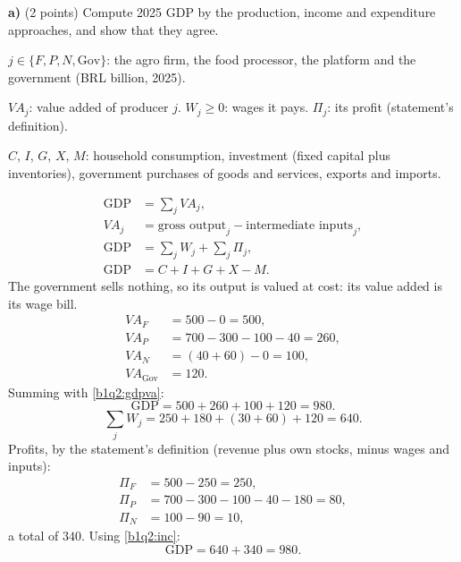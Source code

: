 \textbf{a)} (2 points) Compute 2025 GDP by the production, income and expenditure approaches, and show that they agree.
\resolespaco
\begin{sol}
\begin{notacao}
\item $j\in\{F,P,N,\text{Gov}\}$: the agro firm, the food processor, the platform and the government (BRL billion, 2025).
\item $VA_j$: value added of producer $j$. $W_j\ge0$: wages it pays. $\Pi_j$: its profit (statement's definition).
\item $C$, $I$, $G$, $X$, $M$: household consumption, investment (fixed capital plus inventories), government purchases
of goods and services, exports and imports.
\end{notacao}
\begin{align}
\text{GDP}&=\textstyle\sum_j VA_j, \label{b1q2:gdpva}\\
VA_j&=\text{gross output}_j-\text{intermediate inputs}_j, \label{b1q2:va}\\
\text{GDP}&=\textstyle\sum_j W_j+\sum_j\Pi_j, \label{b1q2:inc}\\
\text{GDP}&=C+I+G+X-M. \label{b1q2:exp}
\end{align}
The government sells nothing, so its output is valued at cost: its value added is its wage bill.
\begin{align*}
VA_F&=500-0=500,\\
VA_P&=700-300-100-40=260,\\
VA_N&=(40+60)-0=100,\\
VA_{\text{Gov}}&=120.
\end{align*}
Summing with \eqref{b1q2:gdpva}:
\[
\text{GDP}=500+260+100+120=980 .
\]
\[
\textstyle\sum_j W_j=250+180+(30+60)+120=640 .
\]
Profits, by the statement's definition (revenue plus own stocks, minus wages and inputs):
\begin{align*}
\Pi_F&=500-250=250,\\
\Pi_P&=700-300-100-40-180=80,\\
\Pi_N&=100-90=10,
\end{align*}
a total of $340$. Using \eqref{b1q2:inc}:
\[
\text{GDP}=640+340=980 .
\]
\end{sol}
